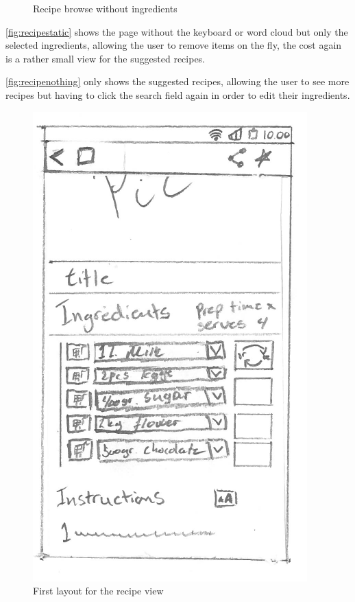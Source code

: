 \begin{figure}[H]
\begin{minipage}[b]{0.5\columnwidth}
\caption{Recipe browse without ingredients\label{fig:recipenothing}}
\end{minipage}
\end{figure}

\autoref{fig:recipestatic} shows the page without the keyboard or word cloud but only the selected ingredients, allowing the user to remove items on the fly, the cost again is a rather small view for the suggested recipes.


\autoref{fig:recipenothing} only shows the suggested recipes, allowing the user to see more recipes but having to click the search field again in order to edit their ingredients. 


\begin{figure}[H]
\begin{minipage}[b]{0.5\columnwidth}
\centering
\includegraphics[width=0.7\columnwidth]{img/prototypes/recipe_old.pdf}
\caption{First layout for the recipe view\label{fig:recipeold}}
\end{minipage}
\hspace{0.5cm}
\begin{minipage}[b]{0.5\columnwidth}

\end{minipage}
\end{figure}
